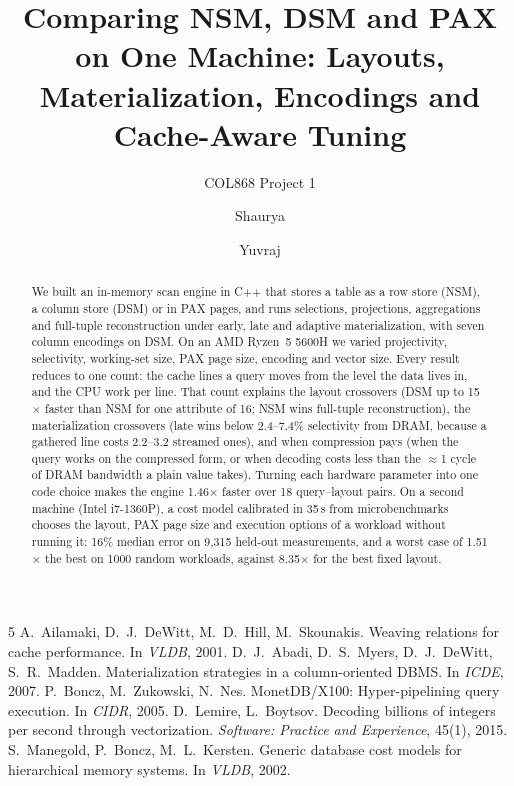 \documentclass[sigconf,nonacm]{acmart}
\begin{document}
\title{Comparing NSM, DSM and PAX on One Machine: Layouts, Materialization, Encodings and
Cache-Aware Tuning}
\subtitle{COL868 Project 1}

\author{Shaurya}
\author{Yuvraj}

\begin{abstract}
We built an in-memory scan engine in C++ that stores a table as a row store (NSM), a column
store (DSM) or in PAX pages, and runs selections, projections, aggregations and full-tuple
reconstruction under early, late and adaptive materialization, with seven column encodings on
DSM. On an AMD Ryzen~5 5600H we varied projectivity, selectivity, working-set size, PAX page
size, encoding and vector size. Every result reduces to one count: the cache lines a query
moves from the level the data lives in, and the CPU work per line. That count explains the
layout crossovers (DSM up to 15$\times$ faster than NSM for one attribute of 16; NSM wins
full-tuple reconstruction), the materialization crossovers (late wins below 2.4--7.4\%
selectivity from DRAM, because a gathered line costs 2.2--3.2 streamed ones), and when
compression pays (when the query works on the compressed form, or when decoding costs less
than the $\approx$1 cycle of DRAM bandwidth a plain value takes). Turning each hardware
parameter into one code choice makes the engine 1.46$\times$ faster over 18 query--layout
pairs. On a second machine (Intel i7-1360P), a cost model calibrated in 35\,s from
microbenchmarks chooses the layout, PAX page size and execution options of a workload without
running it: 16\% median error on 9,315 held-out measurements, and a worst case of 1.51$\times$
the best on 1000 random workloads, against 8.35$\times$ for the best fixed layout.
\end{abstract}

\maketitle











\begin{thebibliography}{5}
 A.~Ailamaki, D.~J.~DeWitt, M.~D.~Hill, M.~Skounakis. Weaving relations for
cache performance. In \emph{VLDB}, 2001.
 D.~J.~Abadi, D.~S.~Myers, D.~J.~DeWitt, S.~R.~Madden. Materialization
strategies in a column-oriented DBMS. In \emph{ICDE}, 2007.
 P.~Boncz, M.~Zukowski, N.~Nes. MonetDB/X100: Hyper-pipelining query execution.
In \emph{CIDR}, 2005.
 D.~Lemire, L.~Boytsov. Decoding billions of integers per second through
vectorization. \emph{Software: Practice and Experience}, 45(1), 2015.
 S.~Manegold, P.~Boncz, M.~L.~Kersten. Generic database cost models for
hierarchical memory systems. In \emph{VLDB}, 2002.
\end{thebibliography}
\end{document}
